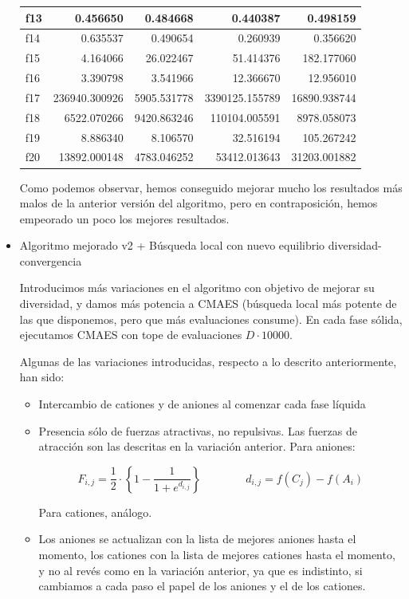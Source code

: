 \documentclass[a4paper,11pt]{article}
\begin{document}
\begin{itemize}
\begin{table}[H]
\begin{tabular}{|l|r|r|||r|r|}
  f13 &  0.456650 &  0.484668 &  0.440387 &  0.498159 \\ \hline
  f14 &  0.635537 &  0.490654 &  0.260939 &  0.356620 \\ \hline
  f15 &  4.164066 &  26.022467 &  51.414376 &  182.177060 \\ \hline
  f16 &  3.390798 &  3.541966 &  12.366670 &  12.956010 \\ \hline
  f17 &  236940.300926 &  5905.531778 &  3390125.155789 &  16890.938744 \\ \hline
  f18 &  6522.070266 &  9420.863246 &  110104.005591 &  8978.058073 \\ \hline
  f19 &  8.886340 &  8.106570 &  32.516194 &  105.267242 \\ \hline
  f20 &  13892.000148 &  4783.046252 &  53412.013643 &  31203.001882 \\ \hline
  \end{tabular}
  \end{table}
 
 
 Como podemos observar, hemos conseguido mejorar mucho los resultados más malos de la anterior versión del algoritmo, pero
 en contraposición, hemos empeorado un poco los mejores resultados.
 
 \item Algoritmo mejorado v2 + Búsqueda local con nuevo equilibrio diversidad-convergencia
 
 Introducimos más variaciones en el algoritmo con objetivo de mejorar su diversidad, y damos más potencia a CMAES (búsqueda
 local más potente de las que disponemos, pero que más evaluaciones consume). En cada fase sólida, ejecutamos CMAES con tope
 de evaluaciones $D \cdot 10000$. 
 
 Algunas de las variaciones introducidas, respecto a lo descrito anteriormente, han sido:
 \begin{itemize}
  \item Intercambio de cationes y de aniones al comenzar cada fase líquida
  \item Presencia sólo de fuerzas atractivas, no repulsivas. Las fuerzas de atracción son las descritas en la variación anterior.
  Para aniones: 
  
     $$F_{i,j} = \frac{1}{2} \cdot \left\{1-\frac{1}{1+e^{d_{i,j}}}\right\} \qquad \qquad d_{i,j} = {f(C_j) - f(A_i)}$$ 
     
  Para cationes, análogo.
  
  \item Los aniones se actualizan con la lista de mejores aniones hasta el momento, los cationes con la lista de mejores cationes
  hasta el momento, y no al revés como en la variación anterior, ya que es indistinto, si cambiamos a cada paso el papel
  de los aniones y el de los cationes.
  

\end{itemize}
\end{itemize}
\end{document}
